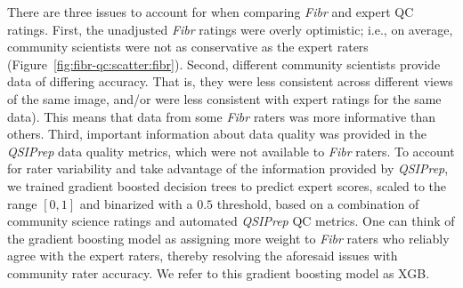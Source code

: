\documentclass[fleqn,10pt,inline]{wlscirep}
\begin{document}
There are three issues to account for when comparing \emph{Fibr} and expert QC ratings. First, the unadjusted \emph{Fibr} ratings were overly optimistic; i.e., on average,
community scientists were not as conservative as the expert raters
(Figure~\ref{fig:fibr-qc:scatter:fibr}). Second, different community scientists
provide data of differing accuracy. That is, they were less consistent across different views of the same image, and/or were less consistent with expert ratings for the same data). This means that data from some \emph{Fibr} raters was more informative than others. Third, important information
about data quality was provided in the \emph{QSIPrep} data quality metrics, which were not available to \emph{Fibr} raters. To account for rater
variability and take advantage of the information provided by \emph{QSIPrep},
we trained gradient boosted decision trees \cite{chen2016-eb} to predict expert scores, scaled to the range $[0, 1]$ and
binarized with a $0.5$ threshold,
based on a combination of community science ratings and automated \emph{QSIPrep}
QC metrics. One can think of the gradient boosting model as assigning more weight to \emph{Fibr} raters who reliably agree with the expert raters, thereby resolving the aforesaid issues with community rater accuracy. We refer to this gradient boosting model as XGB.
\end{document}
